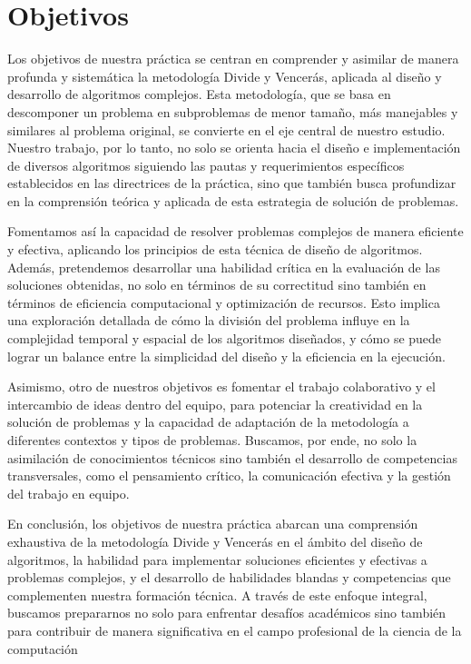 \documentclass{article}
\begin{document}
\section{Objetivos}
Los objetivos de nuestra práctica se centran en comprender y asimilar de manera profunda y sistemática la metodología Divide y Vencerás, aplicada al diseño y desarrollo de algoritmos complejos. Esta metodología, que se basa en descomponer un problema en subproblemas de menor tamaño, más manejables y similares al problema original, se convierte en el eje central de nuestro estudio. Nuestro trabajo, por lo tanto, no solo se orienta hacia el diseño e implementación de diversos algoritmos siguiendo las pautas y requerimientos específicos establecidos en las directrices de la práctica, sino que también busca profundizar en la comprensión teórica y aplicada de esta estrategia de solución de problemas.

Fomentamos así la capacidad de resolver problemas complejos de manera eficiente y efectiva, aplicando los principios de esta técnica de diseño de algoritmos. Además, pretendemos desarrollar una habilidad crítica en la evaluación de las soluciones obtenidas, no solo en términos de su correctitud sino también en términos de eficiencia computacional y optimización de recursos. Esto implica una exploración detallada de cómo la división del problema influye en la complejidad temporal y espacial de los algoritmos diseñados, y cómo se puede lograr un balance entre la simplicidad del diseño y la eficiencia en la ejecución.

Asimismo, otro de nuestros objetivos es fomentar el trabajo colaborativo y el intercambio de ideas dentro del equipo, para potenciar la creatividad en la solución de problemas y la capacidad de adaptación de la metodología a diferentes contextos y tipos de problemas. Buscamos, por ende, no solo la asimilación de conocimientos técnicos sino también el desarrollo de competencias transversales, como el pensamiento crítico, la comunicación efectiva y la gestión del trabajo en equipo.

En conclusión, los objetivos de nuestra práctica abarcan una comprensión exhaustiva de la metodología Divide y Vencerás en el ámbito del diseño de algoritmos, la habilidad para implementar soluciones eficientes y efectivas a problemas complejos, y el desarrollo de habilidades blandas y competencias que complementen nuestra formación técnica. A través de este enfoque integral, buscamos prepararnos no solo para enfrentar desafíos académicos sino también para contribuir de manera significativa en el campo profesional de la ciencia de la computación
\end{document}
